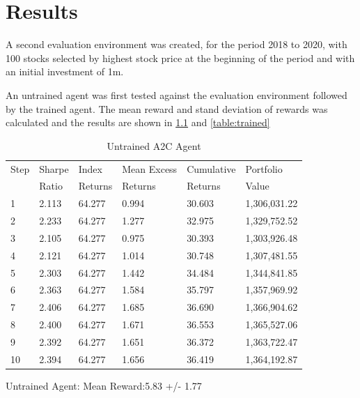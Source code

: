 \documentclass[oneside,12pt]{Classes/RoboticsLaTeX}
\begin{document}
\chapter{Results}
\label{chap:resutls}
A second evaluation environment was created, for the period 2018 to 2020, with 100 stocks selected by highest stock price at the beginning of the period and with an initial investment of 1m.

An untrained agent was first tested against the evaluation environment followed by the trained agent.
The mean reward and stand deviation of rewards was calculated and the results are shown in \ref{table:untrained} and \ref{table:trained}

\begin{table}[h]
    \centering
    \begin{tabular}{|l|l|l|l|l|l|}
    \hline
     Step & Sharpe & Index & Mean Excess & Cumulative& Portfolio\\
     \-\ & Ratio & Returns & Returns & Returns & Value\\
    \hline
    1 &2.113 & 64.277 & 0.994  & 30.603 & 1,306,031.22\\
    \hline
    2 &2.233 & 64.277 & 1.277  & 32.975 & 1,329,752.52\\
    \hline
    3 &2.105 & 64.277 & 0.975  & 30.393 & 1,303,926.48\\
    \hline
    4 &2.121 & 64.277 & 1.014  & 30.748 & 1,307,481.55\\
    \hline
    5 &2.303 & 64.277 & 1.442  & 34.484 & 1,344,841.85\\
    \hline
    6 &2.363 & 64.277 & 1.584  & 35.797 & 1,357,969.92\\
    \hline
    7 &2.406 & 64.277 & 1.685  & 36.690 & 1,366,904.62\\
    \hline
    8 &2.400 & 64.277 & 1.671  & 36.553 & 1,365,527.06\\
    \hline
    9 &2.392 & 64.277 & 1.651  & 36.372 & 1,363,722.47\\
    \hline
    10 &2.394 & 64.277 & 1.656  & 36.419 & 1,364,192.87\\
    \hline
    \end{tabular}
    \caption{Untrained A2C Agent}
    \label{table:untrained}
\end{table}

Untrained Agent: Mean Reward:5.83 +/- 1.77
\end{document}
